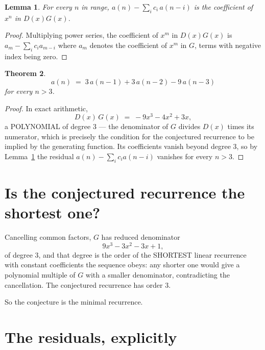 \documentclass[11pt,a4paper]{article}
\theoremstyle{plain}
\newtheorem{theorem}{Theorem}
\newtheorem{lemma}[theorem]{Lemma}
\theoremstyle{definition}
\begin{document}
\begin{lemma}\label{lem:key}
For every $n$ in range, $a(n)-\sum_i c_i\,a(n-i)$ is the coefficient of $x^{n}$ in
$D(x)G(x)$.
\end{lemma}

\begin{proof}
Multiplying power series, the coefficient of $x^{m}$ in $D(x)G(x)$ is
$a_m-\sum_i c_i a_{m-i}$ where $a_m$ denotes the coefficient of $x^{m}$ in $G$, terms with
negative index being zero.
\end{proof}

\begin{theorem}
\[
a(n)\;=\;3\,a(n-1) + 3\,a(n-2) - 9\,a(n-3)
\]
for every $n>3$.
\end{theorem}

\begin{proof}
In exact arithmetic,
\[
D(x)\,G(x)\;=\;- 9 x^{3} - 4 x^{2} + 3 x,
\]
a POLYNOMIAL of degree $3$ --- the denominator of $G$ divides $D(x)$ times its numerator,
which is precisely the condition for the conjectured recurrence to be implied by the
generating function. Its coefficients vanish beyond degree $3$, so by
Lemma~\ref{lem:key} the residual $a(n)-\sum_ic_ia(n-i)$ vanishes for every
$n>3$.
\end{proof}

\section{Is the conjectured recurrence the shortest one?}

Cancelling common factors, $G$ has reduced denominator
\[
9 x^{3} - 3 x^{2} - 3 x + 1,
\]
of degree $3$, and that degree is the order of the SHORTEST linear recurrence with
constant coefficients the sequence obeys: any shorter one would give a polynomial multiple of
$G$ with a smaller denominator, contradicting the cancellation. The conjectured recurrence has
order $3$.

So the conjecture is the minimal recurrence.

\section{The residuals, explicitly}
\end{document}
